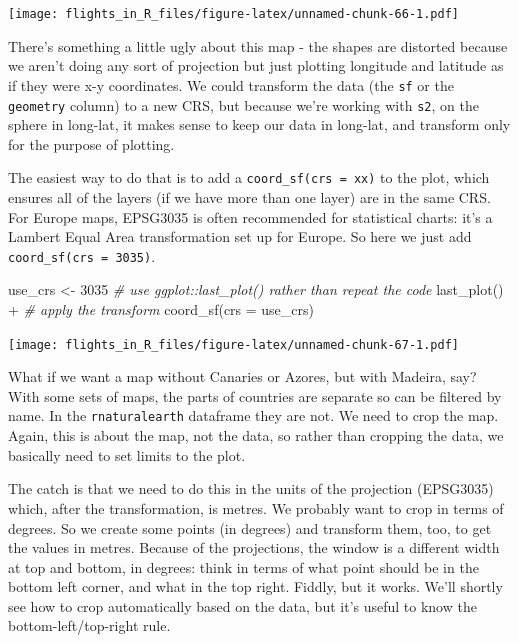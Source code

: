\documentclass[
]{book}
\newenvironment{Shaded}{\begin{snugshade}}{\end{snugshade}}
\newcommand{\AttributeTok}[1]{\textcolor[rgb]{0.77,0.63,0.00}{#1}}
\newcommand{\CommentTok}[1]{\textcolor[rgb]{0.56,0.35,0.01}{\textit{#1}}}
\newcommand{\DecValTok}[1]{\textcolor[rgb]{0.00,0.00,0.81}{#1}}
\newcommand{\FunctionTok}[1]{\textcolor[rgb]{0.00,0.00,0.00}{#1}}
\newcommand{\NormalTok}[1]{#1}
\newcommand{\OtherTok}[1]{\textcolor[rgb]{0.56,0.35,0.01}{#1}}
\newcommand{\SpecialCharTok}[1]{\textcolor[rgb]{0.00,0.00,0.00}{#1}}
\begin{document}
\texttt{[image: flights\_in\_R\_files/figure-latex/unnamed-chunk-66-1.pdf]}

There's something a little ugly about this map - the shapes are distorted because we aren't doing any sort of projection but just plotting longitude and latitude as if they were x-y coordinates. We could transform the data (the \texttt{sf} or the \texttt{geometry} column) to a new CRS, but because we're working with \texttt{s2}, on the sphere in long-lat, it makes sense to keep our data in long-lat, and transform only for the purpose of plotting.

The easiest way to do that is to add a \texttt{coord\_sf(crs\ =\ xx)} to the plot, which ensures all of the layers (if we have more than one layer) are in the same CRS. For Europe maps, EPSG3035 is often recommended for statistical charts: it's a Lambert Equal Area transformation set up for Europe. So here we just add \texttt{coord\_sf(crs\ =\ 3035)}.

\begin{Shaded}
\begin{Highlighting}[]
\NormalTok{use\_crs }\OtherTok{\textless{}{-}} \DecValTok{3035}
\CommentTok{\# use ggplot::last\_plot() rather than repeat the code}
\FunctionTok{last\_plot}\NormalTok{() }\SpecialCharTok{+}
  \CommentTok{\# apply the transform}
  \FunctionTok{coord\_sf}\NormalTok{(}\AttributeTok{crs =}\NormalTok{ use\_crs)}
\end{Highlighting}
\end{Shaded}

\texttt{[image: flights\_in\_R\_files/figure-latex/unnamed-chunk-67-1.pdf]}

What if we want a map without Canaries or Azores, but with Madeira, say? With some sets of maps, the parts of countries are separate so can be filtered by name. In the \texttt{rnaturalearth} dataframe they are not. We need to crop the map. Again, this is about the map, not the data, so rather than cropping the data, we basically need to set limits to the plot.

The catch is that we need to do this in the units of the projection (EPSG3035) which, after the transformation, is metres. We probably want to crop in terms of degrees. So we create some points (in degrees) and transform them, too, to get the values in metres. Because of the projections, the window is a different width at top and bottom, in degrees: think in terms of what point should be in the bottom left corner, and what in the top right. Fiddly, but it works. We'll shortly see how to crop automatically based on the data, but it's useful to know the bottom-left/top-right rule.
\end{document}
